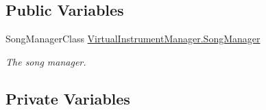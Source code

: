 \subsection*{Public Variables}
\begin{DoxyCompactItemize}
\item 
Song\+Manager\+Class \hyperlink{group___virtual_instrument_manager_event_types_ga33dae94932c10c66db76a0eebec76b01}{Virtual\+Instrument\+Manager.\+Song\+Manager}
\begin{DoxyCompactList}\small\item\em The song manager. \end{DoxyCompactList}\end{DoxyCompactItemize}
\subsection*{Private Variables}
